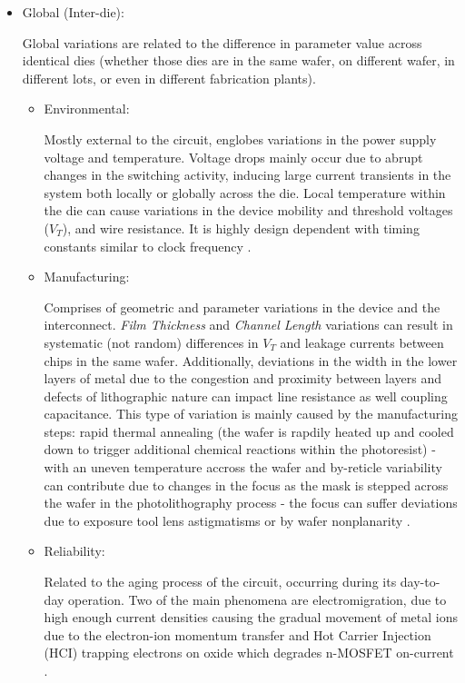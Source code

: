 \documentclass[pgmicro,mestrado,english]{iiufrgs}
\begin{document}
\begin{itemize}
	
	\item Global (Inter-die):

	Global variations are related to the difference in parameter value across identical dies (whether those dies are in the same wafer, on different wafer, in different lots, or even in different fabrication plants).
		\begin{itemize}

		\item Environmental:

		Mostly external to the circuit, englobes variations in the power supply voltage and temperature. Voltage drops mainly occur due to abrupt changes in the switching activity, inducing large current transients in the system both locally or globally across the die. Local temperature within the die can cause variations in the device mobility and threshold voltages ($V_T$), and wire resistance. It is highly design dependent with timing constants similar to clock frequency \cite{nassif:08} \cite{bernstein2006high}.
			
		\item Manufacturing:

		Comprises of geometric and parameter variations in the device and the interconnect. \textit{Film Thickness} and \textit{Channel Length} variations can result in systematic (not random) differences in $V_T$ and leakage currents between chips in the same wafer. Additionally, deviations in the width in the lower layers of metal due to the congestion and proximity between layers and defects of lithographic nature can impact line resistance as well coupling capacitance. This type of variation is mainly caused by the manufacturing steps: rapid thermal annealing (the wafer is rapdily heated up and cooled down to trigger additional chemical reactions within the photoresist) - with an uneven temperature accross the wafer and by-reticle variability can contribute due to changes in the focus as the mask is stepped across the wafer in the photolithography process - the focus can suffer deviations due to exposure tool lens astigmatisms or by wafer nonplanarity \cite{bernstein2006high, qian2015variability}.  

		\item Reliability:

		Related to the aging process of the circuit, occurring during its day-to-day operation. Two of the main phenomena are electromigration, due to high enough current densities causing the gradual movement of metal ions due to the electron-ion momentum transfer \cite{young1994failure} and Hot Carrier Injection (HCI) trapping electrons on oxide which degrades n-MOSFET on-current \cite{takeda1983empirical} \cite{nassif:08} \cite{bernstein2006high}.	
		\end{itemize}


\end{itemize}
\end{document}
